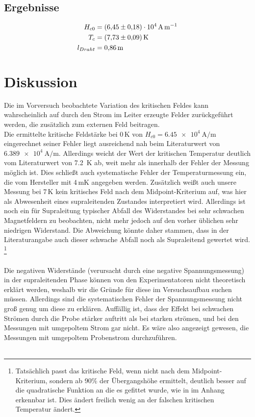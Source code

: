 \documentclass[german,  %
parskip=full,  %
headsepline]{scrartcl}
\newcommand{\bcref}[1]{\namecref{#1} \textcolor{blue}{\labelcref{#1}}}
\begin{document}
\subsection{Ergebnisse}
\begin{align*}
    H_{c0}&=\SI{6.45\pm0.18e4}{\ampere\per\meter}\\
    T_c&=\SI{7.73\pm0.09}{K}\\
    l_{Draht}&= \SI{0.86}{\meter}
\end{align*}

\section{Diskussion}\label{diskussion}
Die im Vorversuch beobachtete Variation des kritischen Feldes kann wahrscheinlich auf durch den Strom im Leiter erzeugte Felder zurückgeführt werden, die zusätzlich zum externen Feld beitragen.\\
Die ermittelte kritische Feldstärke bei 0\,K von $H_{c0}=\SI{6.45e4}{\ampere\per\meter}$ eingerechnet seiner Fehler liegt ausreichend nah beim Literaturwert von $\SI{6.389e4}{\ampere\per\meter}$. Allerdings weicht der Wert der kritischen Temperatur deutlich vom Literaturwert von 7.2\, K ab, weit mehr als innerhalb der Fehler der Messung möglich ist. Dies schließt auch systematische Fehler der Temperaturmessung ein, die vom Hersteller mit 4\,mK angegeben werden\cite{Cernox}. Zusätzlich weißt auch unsere Messung bei 7\,K kein kritisches Feld nach dem Midpoint-Kriterium auf, was hier als Abwesenheit eines supraleitenden Zustandes interpretiert wird. Allerdings ist noch ein für Supraleitung typischer Abfall des Widerstandes bei sehr schwachen Magnetfeldern zu beobachten, nicht mehr jedoch auf den vorher üblichen sehr niedrigen Widerstand. Die Abweichung könnte daher stammen, dass in der Literaturangabe auch dieser schwache Abfall noch als Supraleitend gewertet wird.
\footnote{Tatsächlich passt das kritische Feld, wenn nicht nach dem Midpoint-Kriterium, sondern ab 90\% der Übergangshöhe ermittelt, deutlich besser auf die quadratische Funktion an die es gefittet wurde, wie in \bcref{fig:Hc90} im Anhang erkennbar ist. Dies ändert freilich wenig an der falschen kritischen Temperatur ändert.}\\\\
Die negativen Widerstände (verursacht durch eine negative Spannungsmessung) in der supraleitenden Phase können von den Experimentatoren nicht theoretisch erklärt werden, weshalb wir die Gründe für diese im Versuchsaufbau suchen müssen. Allerdings sind die systematischen Fehler der Spannungsmessung nicht groß genug um diese zu erklären. Auffällig ist, dass der Effekt bei schwachen Strömen durch die Probe stärker auftritt als bei starken strömen, und bei den Messungen mit umgepoltem Strom gar nicht. Es wäre also angezeigt gewesen, die Messungen mit umgepoltem Probenstrom durchzuführen.\\\\
\end{document}

